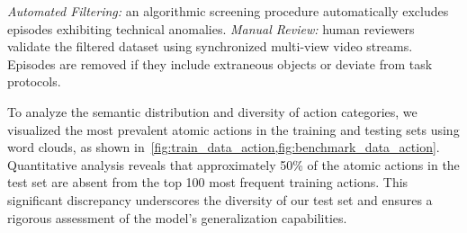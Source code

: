 \textit{Automated Filtering:} an algorithmic screening procedure automatically excludes episodes exhibiting technical anomalies.
\textit{Manual Review:} 
human reviewers validate the filtered dataset using synchronized multi-view video streams. Episodes are removed if they include extraneous objects or deviate from task protocols.


To analyze the semantic distribution and diversity of action categories, we visualized the most prevalent atomic actions in the training and testing sets using word clouds, as shown in~\cref{fig:train_data_action,fig:benchmark_data_action}. Quantitative analysis reveals that approximately 50\% of the atomic actions in the test set are absent from the top 100 most frequent training actions. This significant discrepancy underscores the diversity of our test set and ensures a rigorous assessment of the model's generalization capabilities.


